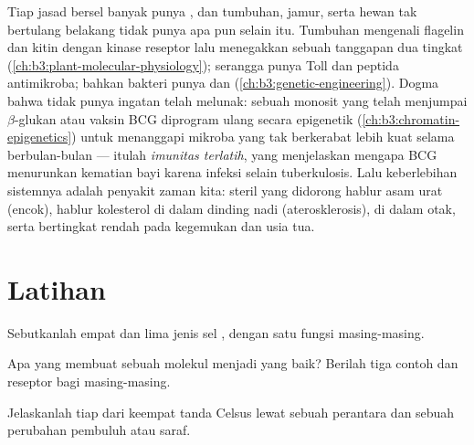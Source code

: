 \begin{remark}\label{rem:b3:innate-immunity:everywhere}
Tiap jasad bersel banyak punya , dan tumbuhan, jamur,
serta hewan tak bertulang belakang tidak punya apa pun selain itu. Tumbuhan
mengenali flagelin dan kitin dengan kinase reseptor lalu menegakkan sebuah
tanggapan dua tingkat (\cref{ch:b3:plant-molecular-physiology}); serangga punya
Toll dan peptida antimikroba; bahkan bakteri punya  dan
 (\cref{ch:b3:genetic-engineering}). Dogma bahwa 
tidak punya ingatan telah melunak: sebuah monosit yang telah menjumpai
$\beta$-glukan atau vaksin BCG diprogram ulang secara epigenetik
(\cref{ch:b3:chromatin-epigenetics}) untuk menanggapi mikroba yang tak
berkerabat lebih kuat selama berbulan-bulan --- itulah \emph{imunitas terlatih},
yang menjelaskan mengapa BCG menurunkan kematian bayi karena infeksi selain
tuberkulosis. Lalu keberlebihan sistemnya adalah penyakit zaman kita:
 steril yang didorong hablur asam urat (encok), hablur kolesterol
di dalam dinding nadi (aterosklerosis),  di dalam otak,
serta  bertingkat rendah pada kegemukan dan usia tua.
\end{remark}

\section{Latihan}

\begin{exercise}[$\star$]\label{exo:b3:innate-immunity:1}
Sebutkanlah empat  dan lima jenis sel , dengan satu
fungsi masing-masing.
\end{exercise}

\begin{exercise}[$\star$]\label{exo:b3:innate-immunity:2}
Apa yang membuat sebuah molekul menjadi  yang baik?
Berilah tiga contoh dan reseptor bagi masing-masing.
\end{exercise}

\begin{exercise}[$\star$]\label{exo:b3:innate-immunity:3}
Jelaskanlah tiap dari keempat tanda Celsus lewat sebuah perantara dan sebuah
perubahan pembuluh atau saraf.
\end{exercise}

